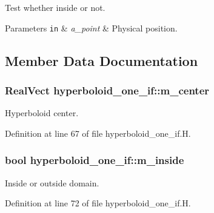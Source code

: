 Test whether inside or not. 


\begin{DoxyParams}[1]{Parameters}
\mbox{\tt in}  & {\em a\+\_\+point} & Physical position. \\
\hline
\end{DoxyParams}


\subsection{Member Data Documentation}
\subsubsection[{\texorpdfstring{m\+\_\+center}{m_center}}]{\setlength{\rightskip}{0pt plus 5cm}Real\+Vect hyperboloid\+\_\+one\+\_\+if\+::m\+\_\+center\hspace{0.3cm}{\ttfamily [protected]}}\hypertarget{classhyperboloid__one__if_a705bda123396b99e5d59a3b52cf3e18a}{}\label{classhyperboloid__one__if_a705bda123396b99e5d59a3b52cf3e18a}


Hyperboloid center. 



Definition at line 67 of file hyperboloid\+\_\+one\+\_\+if.\+H.

\subsubsection[{\texorpdfstring{m\+\_\+inside}{m_inside}}]{\setlength{\rightskip}{0pt plus 5cm}bool hyperboloid\+\_\+one\+\_\+if\+::m\+\_\+inside\hspace{0.3cm}{\ttfamily [protected]}}\hypertarget{classhyperboloid__one__if_ad505218e6b5323e842ce5a5a9b86b4ce}{}\label{classhyperboloid__one__if_ad505218e6b5323e842ce5a5a9b86b4ce}


Inside or outside domain. 



Definition at line 72 of file hyperboloid\+\_\+one\+\_\+if.\+H.

